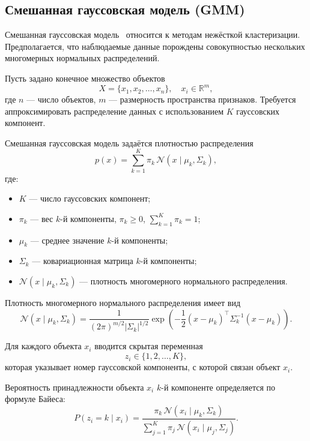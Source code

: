 \subsection{Смешанная гауссовская модель (GMM)}
Смешанная гауссовская модель~\cite{GMM} относится к методам нежёсткой кластеризации. Предполагается, что наблюдаемые данные порождены совокупностью нескольких многомерных нормальных распределений.

Пусть задано конечное множество объектов
\[
X = \{x_1, x_2, \dots, x_n\}, \quad x_i \in \mathbb{R}^m,
\]
где $n$ --- число объектов, $m$ --- размерность пространства признаков. Требуется аппроксимировать распределение данных с использованием $K$ гауссовских компонент.

Смешанная гауссовская модель задаётся плотностью распределения
\begin{equation}
p(x) = \sum_{k=1}^{K} \pi_k \, \mathcal{N}(x \mid \mu_k, \Sigma_k),
\end{equation}
где:
\begin{itemize}
\item[---] $K$ --- число гауссовских компонент;
\item[---] $\pi_k$ --- вес $k$-й компоненты, $\pi_k \geqslant 0$, $\sum\limits_{k=1}^{K} \pi_k = 1$;
\item[---] $\mu_k$ --- среднее значение $k$-й компоненты;
\item[---] $\Sigma_k$ --- ковариационная матрица $k$-й компоненты;
\item[---] $\mathcal{N}(x \mid \mu_k, \Sigma_k)$ --- плотность многомерного нормального распределения.
\end{itemize}

Плотность многомерного нормального распределения имеет вид
\begin{equation}
\mathcal{N}(x \mid \mu_k, \Sigma_k) =
\frac{1}{(2\pi)^{m/2} |\Sigma_k|^{1/2}}
\exp\!\left(
-\frac{1}{2}(x - \mu_k)^\top \Sigma_k^{-1}(x - \mu_k)
\right).
\end{equation}

Для каждого объекта $x_i$ вводится скрытая переменная
\[
z_i \in \{1, 2, \dots, K\},
\]
которая указывает номер гауссовской компоненты, с которой связан объект $x_i$.

Вероятность принадлежности объекта $x_i$ $k$-й компоненте определяется по формуле Байеса:
\begin{equation}
P(z_i = k \mid x_i) =
\frac{\pi_k \, \mathcal{N}(x_i \mid \mu_k, \Sigma_k)}
{\sum\limits_{j=1}^{K} \pi_j \, \mathcal{N}(x_i \mid \mu_j, \Sigma_j)}.
\end{equation}

